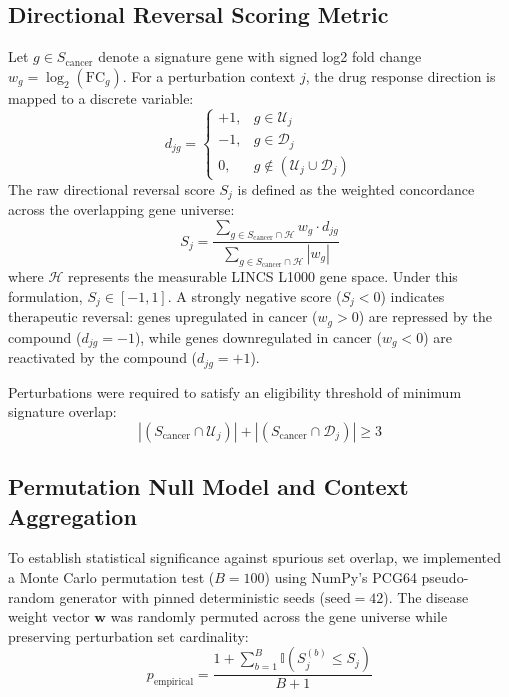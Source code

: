 \documentclass[10pt,journal,compsoc,twocolumn]{IEEEtran}
\begin{document}
\subsection{Directional Reversal Scoring Metric}
Let $g \in S_{\text{cancer}}$ denote a signature gene with signed log2 fold change $w_g = \log_2(\text{FC}_g)$. For a perturbation context $j$, the drug response direction is mapped to a discrete variable:
\begin{equation}
    d_{jg} = 
    \begin{cases}
        +1, & g \in \mathcal{U}_j \\
        -1, & g \in \mathcal{D}_j \\
        0, & g \notin (\mathcal{U}_j \cup \mathcal{D}_j)
    \end{cases}
\end{equation}
The raw directional reversal score $S_j$ is defined as the weighted concordance across the overlapping gene universe:
\begin{equation}
    S_j = \frac{\sum_{g \in S_{\text{cancer}} \cap \mathcal{H}} w_g \cdot d_{jg}}{\sum_{g \in S_{\text{cancer}} \cap \mathcal{H}} |w_g|}
\end{equation}
where $\mathcal{H}$ represents the measurable LINCS L1000 gene space. Under this formulation, $S_j \in [-1, 1]$. A strongly negative score ($S_j < 0$) indicates therapeutic reversal: genes upregulated in cancer ($w_g > 0$) are repressed by the compound ($d_{jg} = -1$), while genes downregulated in cancer ($w_g < 0$) are reactivated by the compound ($d_{jg} = +1$).

Perturbations were required to satisfy an eligibility threshold of minimum signature overlap:
\begin{equation}
    |(S_{\text{cancer}} \cap \mathcal{U}_j)| + |(S_{\text{cancer}} \cap \mathcal{D}_j)| \ge 3
\end{equation}

\subsection{Permutation Null Model and Context Aggregation}
To establish statistical significance against spurious set overlap, we implemented a Monte Carlo permutation test ($B=100$) using NumPy's PCG64 pseudo-random generator with pinned deterministic seeds ($\text{seed}=42$). The disease weight vector $\mathbf{w}$ was randomly permuted across the gene universe while preserving perturbation set cardinality:
\begin{equation}
    p_{\text{empirical}} = \frac{1 + \sum_{b=1}^B \mathbb{I}(S_j^{(b)} \le S_j)}{B + 1}
\end{equation}
\end{document}
